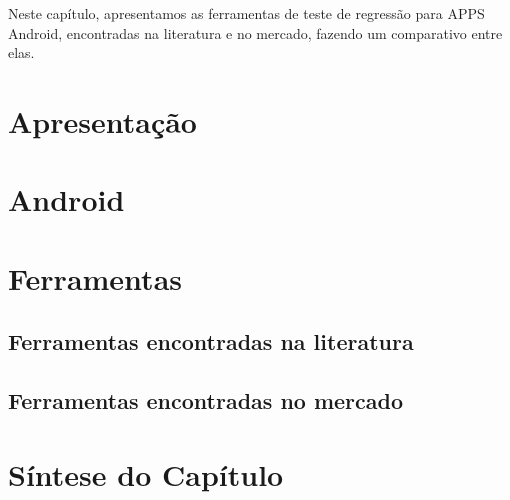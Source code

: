 
Neste capítulo, apresentamos as ferramentas de teste de regressão para \ac{APPS} Android, encontradas na literatura e no mercado, fazendo um comparativo entre elas.

\section{Apresentação}
\section{Android}
\section{Ferramentas}
\subsection{Ferramentas encontradas na literatura}
\subsection{Ferramentas encontradas no mercado}
\section{Síntese do Capítulo}